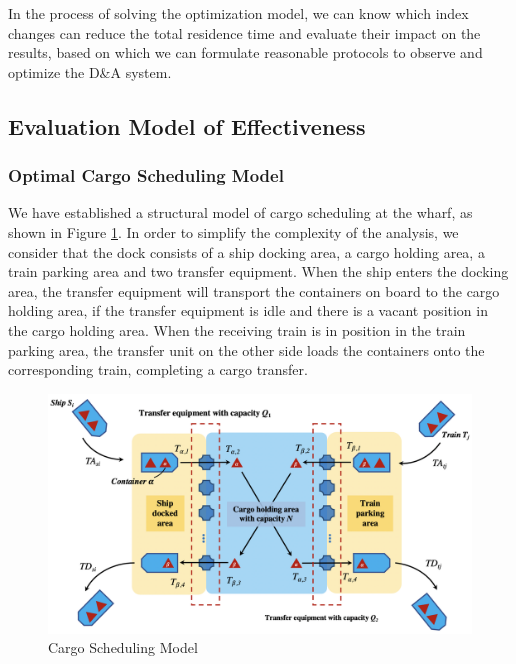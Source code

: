 \documentclass{mcmthesis}
\begin{document}
In the process of solving the optimization model, we can know which index changes can reduce the total residence time and evaluate their impact on the results, based on which we can formulate reasonable protocols to observe and optimize the D\&A system.

\subsection{Evaluation Model of Effectiveness}



\subsubsection{Optimal Cargo Scheduling Model}
We have established a structural model of cargo scheduling at the wharf, as shown in Figure \ref{figure::Cargo Scheduling Model}. In order to simplify the complexity of the analysis, we consider that the dock consists of a ship docking area, a cargo holding area, a train parking area and two transfer equipment. When the ship enters the docking area, the transfer equipment will transport the containers on board to the cargo holding area, if the transfer equipment is idle and there is a vacant position in the cargo holding area. When the receiving train is in position in the train parking area, the transfer unit on the other side loads the containers onto the corresponding train, completing a cargo transfer.
\begin{figure}[!htbp]
    \small
    \centering
    \includegraphics[width=15cm]{figures/DemonstrationonCargoSchedulingModel.png}
    \caption{Cargo Scheduling Model} 
    \label{figure::Cargo Scheduling Model}
\end{figure}%
\end{document}
